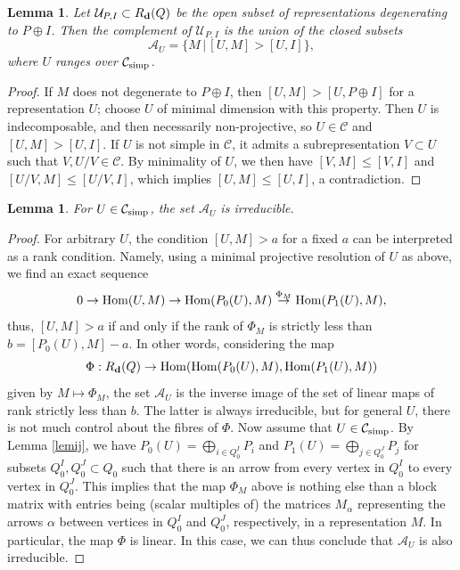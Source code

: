 \documentclass{amsart}
\numberwithin{equation}{section}
\newtheorem{lem}[thm]{Lemma}
\theoremstyle{remark}
\begin{document}
\begin{lem} Let $\mathcal{U}_{P,I}\subset R_{\bf d}(Q)$ be the open subset of representations degenerating to $P\oplus I$. Then the complement of $\mathcal{U}_{P,I}$ is the union of the closed subsets
$$\mathcal{A}_U=\{M\, |\, [U,M]>[U,I]\},$$
where $U$ ranges over $\mathcal{C}_{\rm simp}$. 
\end{lem}

\begin{proof} If $M$ does not degenerate to $P\oplus I$, then $[U,M]>[U,P\oplus I]$ for a representation $U$; choose $U$ of minimal dimension with this property. Then $U$ is indecomposable, and then necessarily non-projective, so $U\in\mathcal{C}$ and $[U,M]>[U,I]$. If $U$ is not simple in $\mathcal{C}$, it admits a subrepresentation $V\subset U$ such that $V,U/V\in\mathcal{C}$. By minimality of $U$, we then have $[V,M]\leq[V,I]$ and $[U/V,M]\leq[U/V,I]$, which implies $[U,M]\leq[U,I]$, a contradiction.
\end{proof}

\begin{lem} For $U\in\mathcal{C}_{\rm simp}$, the set $\mathcal{A}_U$ is irreducible.
\end{lem}


\begin{proof} For arbitrary $U$, the condition $[U,M]>a$ for a fixed $a$ can be interpreted as a rank condition. Namely, using a minimal projective resolution of $U$ as above, we find an exact sequence
$$0\rightarrow{\rm Hom}(U,M)\rightarrow{\rm Hom}(P_0(U),M)\stackrel{\Phi_M}{\rightarrow}{\rm Hom}(P_1(U),M),$$
thus, $[U,M]>a$ if and only if the rank of $\Phi_M$ is strictly less than $b=[P_0(U),M]-a$. 
In other words, considering the map 
\[
\Phi: R_{\bf d}(Q)\to {\rm Hom}({\rm Hom}(P_0(U),M),{\rm Hom}(P_1(U),M))
\]
given by $M\mapsto \Phi_M$, the set $\mathcal{A}_U$ is the inverse image of the set of linear maps of 
rank strictly less than $b$. The latter is always irreducible, but for general $U$, there is not much 
control about the fibres of $\Phi$. Now assume that $U\in\mathcal{C}_{\rm simp}$. By Lemma \ref{lemij}, 
we have $P_0(U)=\bigoplus_{i\in Q_0^I}P_i$ 
and $P_1(U)=\bigoplus_{j\in Q_0^J}P_j$ for subsets $Q_0^I,Q_0^J\subset Q_0$ such that there is an arrow 
from every vertex in $Q_0^I$ to every vertex in $Q_0^J$. %
This implies that the map $\Phi_M$ above is nothing else than a block matrix with entries being 
(scalar multiples of) the matrices $M_\alpha$ representing the arrows $\alpha$ between vertices in 
$Q_0^I$ and $Q_0^J$, respectively, in a representation $M$. In particular, the map $\Phi$ is linear. 
In this case, we can thus conclude that $\mathcal{A}_U$ is also irreducible.
\end{proof}
\end{document}
